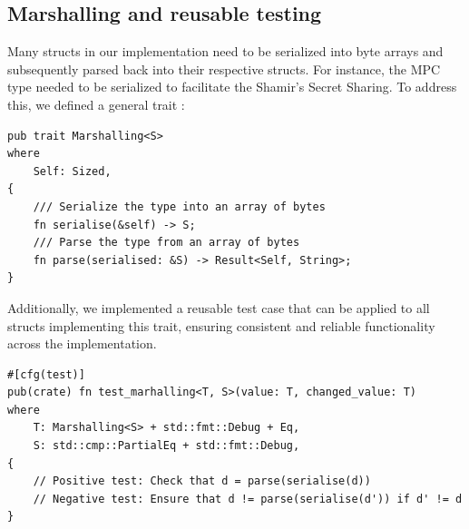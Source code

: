 \documentclass[11pt]{report}
\theoremstyle{definition}
\theoremstyle{plain}
\begin{document}
\subsection{Marshalling and reusable testing}\label{sub:testing_our_implementation}
Many structs in our implementation need to be serialized into byte arrays and subsequently parsed back into their respective structs. For instance, the MPC  type needed to be serialized to facilitate the Shamir's Secret Sharing. To address this, we defined a general trait :

\begin{verbatim}
pub trait Marshalling<S>
where
    Self: Sized,
{
    /// Serialize the type into an array of bytes
    fn serialise(&self) -> S;
    /// Parse the type from an array of bytes
    fn parse(serialised: &S) -> Result<Self, String>;
}
\end{verbatim}

Additionally, we implemented a reusable test case that can be applied to all structs implementing this trait, ensuring consistent and reliable functionality across the implementation.

\begin{verbatim}
#[cfg(test)]
pub(crate) fn test_marhalling<T, S>(value: T, changed_value: T)
where
    T: Marshalling<S> + std::fmt::Debug + Eq,
    S: std::cmp::PartialEq + std::fmt::Debug,
{
    // Positive test: Check that d = parse(serialise(d))
    // Negative test: Ensure that d != parse(serialise(d')) if d' != d
}
\end{verbatim}

%
%
%
%
\end{document}

